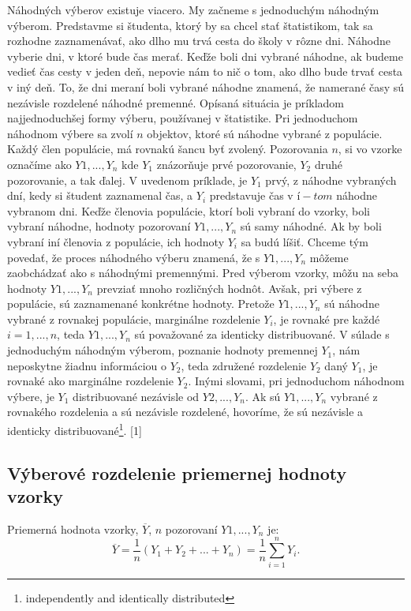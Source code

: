 \documentclass[]{tukediphc}
\begin{document}
Náhodných výberov existuje viacero. My začneme s jednoduchým náhodným výberom. Predstavme si študenta, ktorý by sa chcel stať štatistikom, tak sa rozhodne zaznamenávať, ako dlho mu trvá cesta do školy v rôzne dni. Náhodne vyberie dni, v ktoré bude čas merať. Keďže boli dni vybrané náhodne, ak budeme vedieť čas cesty v jeden deň, nepovie nám to nič o tom, ako dlho bude trvať cesta v iný deň. To, že dni meraní boli vybrané náhodne znamená, že namerané časy sú nezávisle rozdelené náhodné premenné. Opísaná situácia je príkladom najjednoduchšej formy výberu, používanej v štatistike. Pri jednoduchom náhodnom výbere sa zvolí $n$ objektov, ktoré sú náhodne vybrané z populácie. Každý člen populácie, má rovnakú šancu byť zvolený. Pozorovania $n$, si vo vzorke označíme ako $Y1, ..., Y_n$ kde $Y_1$ znázorňuje prvé pozorovanie, $Y_2$ druhé pozorovanie, a tak ďalej. V uvedenom príklade, je $Y_1$ prvý, z náhodne vybraných dní, kedy si študent zaznamenal čas, a $Y_i$ predstavuje čas v $í-tom$ náhodne vybranom dni. 
Keďže členovia populácie, ktorí boli vybraní do vzorky, boli vybraní náhodne, hodnoty pozorovaní $Y1, ..., Y_n$ sú samy náhodné. Ak by boli vybraní iní členovia z populácie, ich hodnoty $Y_i$ sa budú líšiť. Chceme tým povedať, že proces náhodného výberu znamená, že s $Y1, ..., Y_n$ môžeme zaobchádzať ako s náhodnými premennými. Pred výberom vzorky, môžu na seba hodnoty $Y1, ..., Y_n$ prevziať mnoho rozličných hodnôt. Avšak, pri výbere z populácie, sú zaznamenané konkrétne hodnoty. Pretože $Y1, ..., Y_n$ sú náhodne vybrané z rovnakej populácie, marginálne rozdelenie $Y_i$, je rovnaké pre každé $i = 1, ..., n$, teda $Y1, ..., Y_n$ sú považované za identicky distribuované. V súlade s jednoduchým náhodným výberom, poznanie hodnoty premennej $Y_1$, nám neposkytne žiadnu informáciou o $Y_2$, teda združené rozdelenie $Y_2$ daný $Y_1$, je rovnaké ako marginálne rozdelenie $Y_2$. Inými slovami, pri jednoduchom náhodnom výbere, je $Y_1$ distribuované nezávisle od $Y2, ..., Y_n$. 
Ak sú $Y1, ..., Y_n$ vybrané z rovnakého rozdelenia a sú nezávisle rozdelené, hovoríme, že sú nezávisle a identicky distribuované\footnote{independently and identically distributed}. [1]

\subsection{Výberové rozdelenie priemernej hodnoty vzorky}

Priemerná hodnota vzorky, $\overline{Y}$, $n$ pozorovaní $Y1, ..., Y_n$ je:
\begin{equation}
\overline{Y} = \frac{1}{n}(Y_1 + Y_2 + ... + Y_n)=\frac{1}{n}\sum_{i=1}^{n}Y_i.
\end{equation}
\end{document}
